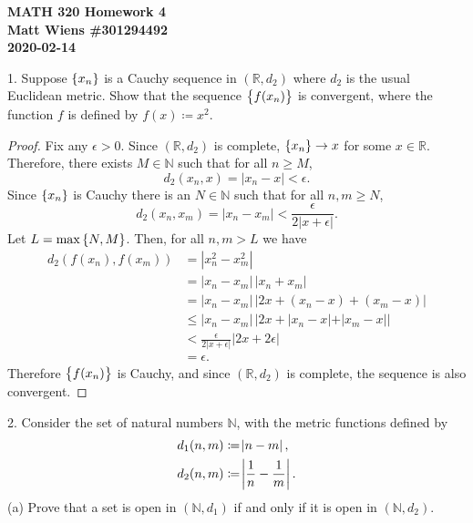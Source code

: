 \documentclass{article}
\newcommand{\N}{\mathbb{N}}
\newcommand{\R}{\mathbb{R}}
\begin{document}
\textbf{MATH 320 Homework 4} \\
\textbf{Matt Wiens \#301294492} \\
\textbf{2020-02-14}

1. Suppose $\cbr{x_n}$ is a Cauchy sequence in $(\R, d_2)$ where $d_2$ is
the usual Euclidean metric. Show that the sequence $\cbr{f(x_n)}$ is
convergent, where the function $f$ is defined by $f(x) \coloneqq x^2$.

\begin{proof}

Fix any $\epsilon > 0$. Since $(\R, d_2)$ is complete, $\cbr{x_n} \to x$
for some $x \in \R$. Therefore, there exists $M \in \N$ such that for
all $n \geq M$,
%
\begin{equation*}
    d_2(x_n, x) = |x_n - x| < \epsilon
    .
\end{equation*}
%
Since $\cbr{x_n}$ is Cauchy there is an $N \in \N$ such that for all $n,
m \geq N$,
%
\begin{equation*}
    d_2(x_n, x_m) = |x_n - x_m| < \frac{\epsilon}{2 |x + \epsilon|}
    .
\end{equation*}
%
Let $L = \max \cbr{N, M}$. Then, for all $n, m > L$ we have
%
\begin{align*}
    d_2(f(x_n), f(x_m))
        &= |x_n^2 - x_m^2| \\
        &= |x_n - x_m| \, |x_n + x_m| \\
        &= |x_n - x_m| \, |2x + (x_n - x) + (x_m - x)| \\
        &\leq |x_n - x_m| \, |2x + |x_n - x| + |x_m - x|| \\
        &< \frac{\epsilon}{2 |x + \epsilon|} |2x + 2\epsilon| \\
        &= \epsilon
        .
\end{align*}
%
Therefore $\cbr{f(x_n)}$ is Cauchy, and since $(\R, d_2)$ is complete,
the sequence is also convergent.

\end{proof}

\newpage

2. Consider the set of natural numbers $\N$, with the metric functions
defined by
%
\begin{align*}
    d_1(n, m) &\coloneqq \envert{n - m}, \\
    d_2(n, m) &\coloneqq \envert{\frac{1}{n} - \frac{1}{m}}.
\end{align*}
%
(a) Prove that a set is open in $(\N, d_1)$ if and only if it is open in
$(\N, d_2)$.
\end{document}
